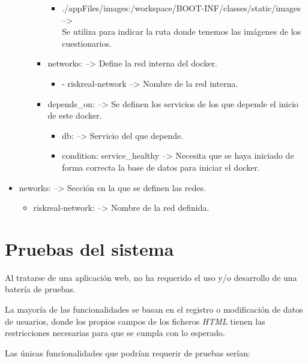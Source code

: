 \begin{itemize}
\begin{itemize}
\begin{itemize}
\begin{itemize}
				\item ./appFiles/images:/workspace/BOOT-INF/classes/static/images --> \\Se utiliza para indicar la ruta donde tenemos las imágenes de los cuestionarios.
			\end{itemize}
			\item networks: --> Define la red interna del docker.
			\begin{itemize}
				\item - riskreal-network --> Nombre de la red interna.
			\end{itemize}
			\item depends\_on: --> Se definen los servicios de los que depende el inicio de este docker.
			\begin{itemize}
				\item db: --> Servicio del que depende.
				\item condition: service\_healthy --> Necesita que se haya iniciado de forma correcta la base de datos para iniciar el docker.
			\end{itemize}
		\end{itemize}
	\end{itemize}
	\item neworks: --> Sección en la que se definen las redes.
	\begin{itemize}
		\item riskreal-network: --> Nombre de la red definida.
	\end{itemize}
\end{itemize}

\section{Pruebas del sistema}

Al tratarse de una aplicación web, no ha requerido el uso y/o desarrollo de una batería de pruebas.

La mayoría de las funcionalidades se basan en el registro o modificación de datos de usuarios, donde los propios campos de los ficheros \textit{HTML} tienen las restricciones necesarias para que se cumpla con lo esperado.

Las únicas funcionalidades que podrían requerir de pruebas serían:

